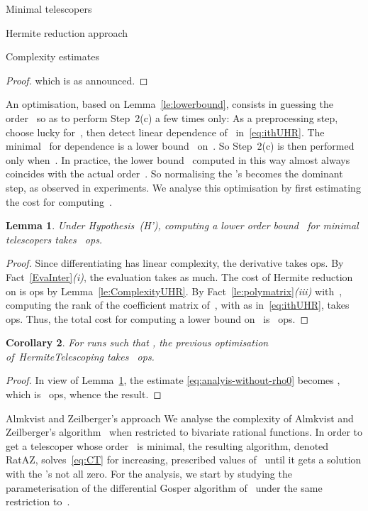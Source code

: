 \documentclass{sig-alt-full}
\newtheorem{lemma}{Lemma}
\newtheorem{cor}[lemma]{Corollary}
\begin{document}
\begin{section}{Minimal telescopers}
\begin{subsection}{Hermite reduction approach}
\begin{subsubsection}{Complexity estimates}
\begin{proof}
which is as announced.
\end{proof}

An optimisation, based on Lemma~\ref{le:lowerbound},
consists in guessing the order~ so as to perform
Step~2(c) a few times only:
As a preprocessing step, choose  lucky for~, then detect
linear dependence of~ in~\eqref{eq:ithUHR}.
The minimal~ for dependence is a lower bound~ on~.
So Step~2(c) is then performed only when~.
In practice, the lower bound~ computed in this way almost always
coincides with the actual order~.
So normalising the 's becomes the dominant step, as observed
in experiments.
We analyse this optimisation by first estimating the cost for
computing~.

\begin{lemma}\label{le:costlowerbound}
Under Hypothesis~(H'), computing a lower order bound~ for minimal
telescopers takes ~ops.
\end{lemma}

\begin{proof}
Since differentiating has linear complexity, the derivative
 takes  ops.
By Fact~\ref{EvaInter}\emph{(i)}, the evaluation 
takes as much.
The cost of Hermite reduction
on  is  ops by
Lemma~\ref{le:ComplexityUHR}.
By Fact~\ref{le:polymatrix}\emph{(iii)\/} with~,
computing the rank of the coefficient
matrix of~, with  as
in~\eqref{eq:ithUHR}, takes  ops.
Thus, the total cost for computing a lower bound on~
is ~ops.
\end{proof}

\begin{cor}
For runs such that , the previous optimisation
of~\textsf{HermiteTelescoping} takes
~ops.
\end{cor}
\begin{proof}
In view of Lemma~\ref{le:costlowerbound},
the estimate \eqref{eq:analyis-without-rho0} becomes
,
which is ~ops,
whence the result.
\end{proof}

\end{subsubsection}
\end{subsection}

\begin{subsection}{Almkvist and Zeilberger's approach}\label{AZA}
We analyse the complexity of Almkvist and Zeilberger's
algorithm~\cite{Almkvist1990} when restricted to bivariate rational
functions.
In order to get a telescoper whose order~ is minimal, the resulting
algorithm, denoted \textsf{RatAZ}, solves~\eqref{eq:CT} for
increasing, prescribed values of~
until it gets a solution  with the 's not all zero.
For the analysis, we start by studying the parameterisation of the
differential Gosper algorithm of~\cite{Almkvist1990}
under the same restriction to~.


\end{subsection}
\end{section}
\end{document}
